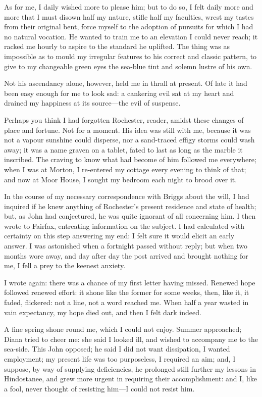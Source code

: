 As for me, I daily wished more to please him; but to do so, I felt daily
more and more that I must disown half my nature, stifle half my
faculties, wrest my tastes from their original bent, force myself to the
adoption of pursuits for which I had no natural vocation. He wanted to
train me to an elevation I could never reach; it racked me hourly to
aspire to the standard he uplifted. The thing was as impossible as to
mould my irregular features to his correct and classic pattern, to give
to my changeable green eyes the sea-blue tint and solemn lustre of his
own.

Not his ascendancy alone, however, held me in thrall at present. Of
late it had been easy enough for me to look sad: a cankering evil sat at
my heart and drained my happiness at its source---the evil of suspense.

Perhaps you think I had forgotten \Mr{} Rochester, reader, amidst these
changes of place and fortune. Not for a moment. His idea was still
with me, because it was not a vapour sunshine could disperse, nor a
sand-traced effigy storms could wash away; it was a name graven on a
tablet, fated to last as long as the marble it inscribed. The craving
to know what had become of him followed me everywhere; when I was at
Morton, I re-entered my cottage every evening to think of that; and now
at Moor House, I sought my bedroom each night to brood over it.

In the course of my necessary correspondence with \Mr{} Briggs about the
will, I had inquired if he knew anything of \Mr{} Rochester's present
residence and state of health; but, as \St{} John had conjectured, he was
quite ignorant of all concerning him. I then wrote to \Mrs{} Fairfax,
entreating information on the subject. I had calculated with certainty
on this step answering my end: I felt sure it would elicit an early
answer. I was astonished when a fortnight passed without reply; but
when two months wore away, and day after day the post arrived and
brought nothing for me, I fell a prey to the keenest anxiety.

I wrote again: there was a chance of my first letter having missed.
Renewed hope followed renewed effort: it shone like the former for some
weeks, then, like it, it faded, flickered: not a line, not a word
reached me. When half a year wasted in vain expectancy, my hope died
out, and then I felt dark indeed.

A fine spring shone round me, which I could not enjoy. Summer
approached; Diana tried to cheer me: she said I looked ill, and wished
to accompany me to the sea-side. This \St{} John opposed; he said I did
not want dissipation, I wanted employment; my present life was too
purposeless, I required an aim; and, I suppose, by way of supplying
deficiencies, he prolonged still further my lessons in Hindostanee, and
grew more urgent in requiring their accomplishment: and I, like a fool,
never thought of resisting him---I could not resist him.

